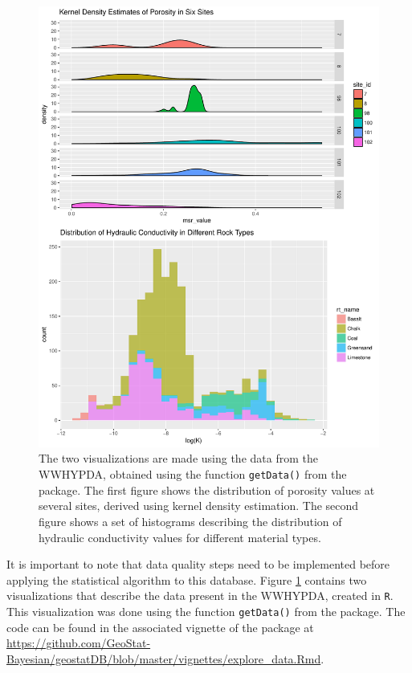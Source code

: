 \begin{figure}
    \centering
    \includegraphics[width=\textwidth]{img/wwhypda_vis_2.pdf}
    \caption{The two visualizations are made using the data from the WWHYPDA, obtained using the function \texttt{getData()} from the  package. The first figure shows the distribution of porosity values at several sites, derived using kernel density estimation. The second figure shows a set of histograms describing the distribution of hydraulic conductivity values for different material types.}
    \label{fig:wwhypda}
\end{figure}

It is important to note that data quality steps need to be implemented before applying the statistical algorithm to this database. 
Figure \ref{fig:wwhypda} contains two visualizations that describe the data present in the WWHYPDA, created in \texttt{R}.
This visualization was done using the function \texttt{getData()} from the  package.
The code can be found in the associated vignette of the package at \url{https://github.com/GeoStat-Bayesian/geostatDB/blob/master/vignettes/explore_data.Rmd}.


